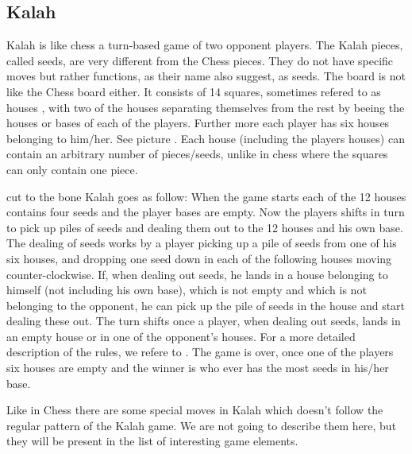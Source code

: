 \subsection{Kalah}

Kalah is like chess a turn-based game of two opponent players. The Kalah pieces, called seeds, are very different from the Chess pieces. They do not have specific moves but rather functions, as their name also suggest, as seeds. The board is not like the Chess board either. It consists of 14 squares, sometimes refered to as houses \cite{kalahrules}, with two of the houses separating themselves from the rest by beeing the houses or bases of each of the players. Further more each player has six houses belonging to him/her. See picture . Each house (including the players houses) can contain an arbitrary number of pieces/seeds, unlike in chess where the squares can only contain one piece.  

cut to the bone Kalah goes as follow: When the game starts each of the 12 houses contains four seeds and the player bases are empty. Now the players shifts in turn to pick up piles of seeds and dealing them out to the 12 houses and his own base. The dealing of seeds works by a player picking up a pile of seeds from one of his six houses, and dropping one seed down in each of the following houses moving counter-clockwise. If, when dealing out seeds, he lands in a house belonging to himself (not including his own base), which is not empty and which is not belonging to the opponent, he can pick up the pile of seeds in the house and start dealing these out. The turn shifts once a player, when dealing out seeds, lands in an empty house or in one of the opponent's houses. For a more detailed description of the rules, we refere to \cite{kalahrules}. The game is over, once one of the players six houses are empty and the winner is who ever has the most seeds in his/her base.

Like in Chess there are some special moves in Kalah which doesn't follow the regular pattern of the Kalah game. We are not going to describe them here, but they will be present in the list of interesting game elements.   


